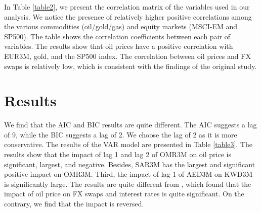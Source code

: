 \documentclass[12pt]{article}
\begin{document}
\begin{sloppypar}
In Table \ref{table2}, we present the correlation matrix of the variables used in our analysis. We notice the presence of relatively higher positive correlations among the various commodities (oil/gold/gas) and equity markets (MSCI-EM and SP500). The table shows the correlation coefficients between each pair of variables. The results show that oil prices have a positive correlation with EUR3M, gold, and the SP500 index. The correlation between oil prices and FX swaps is relatively low, which is consistent with the findings of the original study. 

\section{Results}
We find that the AIC and BIC results are quite different. The AIC suggests a lag of 9, while the BIC suggests a lag of 2. We choose the lag of 2 as it is more conservative. The results of the VAR model are presented in Table \ref{table3}. The results show that the impact of lag 1 and lag 2 of OMR3M on oil price is significant, largest, and negative. Besides, SAR3M has the largest and significant positive impact on OMR3M. Third, the impact of lag 1 of AED3M on KWD3M is significantly large. The results are quite different from \textcite{almaskati2022oil}, which found that the impact of oil price on FX swaps and interest rates is quite significant. On the contrary, we find that the impact is reversed.
\begin{table}[ht]
    \centering
    \caption{VAR Model Results($\alpha$ = 5\%)}
    \label{table3}
\end{table}
\end{sloppypar}
\end{document}
